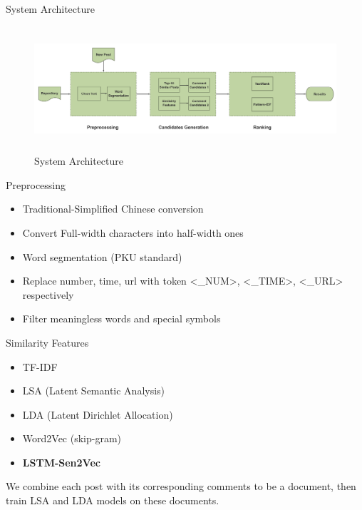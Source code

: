 \documentclass[aspectratio=169]{beamer} %
\begin{document}
    \begin{frame}{System Architecture}
      \begin{figure}
      \includegraphics[width=14cm,height=4.63cm]{stc-flow-big.png}
      \caption{System Architecture}
      \end{figure}
    \end{frame}

    \begin{frame}{Preprocessing}
      \begin{itemize}
        \item Traditional-Simplified Chinese conversion
        \item Convert Full-width characters into half-width ones
        \item Word segmentation (PKU standard)
        \item Replace number, time, url with token <\_NUM>, <\_TIME>, <\_URL> respectively
        \item Filter meaningless words and special symbols
      \end{itemize}
    \end{frame}

    {
    
    }

    \begin{frame}{Similarity Features}
      \begin{itemize}
        \item TF-IDF
        \item LSA (Latent Semantic Analysis)
        \item LDA (Latent Dirichlet Allocation)
        \item Word2Vec (skip-gram)
        \item \textbf{LSTM-Sen2Vec }
      \end{itemize}
      We combine each post with its corresponding comments to be a document, then train LSA and LDA models on these documents.
    \end{frame}
\end{document}
